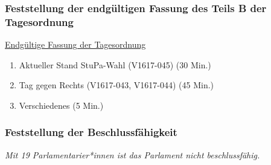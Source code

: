 \documentclass[ngerman,headheight=70pt]{scrartcl}
\begin{document}
    \subsubsection{Feststellung der endgültigen Fassung des Teils B der Tagesordnung}


    \newpage
    \underline{Endgültige Fassung der Tagesordnung}
    \begin{enumerate}[label={\textbf{Top \theenumi}},leftmargin=*]
        \item Aktueller Stand StuPa-Wahl (V1617-045) (30 Min.)
        \item Tag gegen Rechts (V1617-043, V1617-044) (45 Min.)
        \item Verschiedenes (5 Min.)
    \end{enumerate}

    \subsubsection{Feststellung der Beschlussfähigkeit}

    \textit{Mit 19 Parlamentarier*innen ist das Parlament nicht beschlussfähig.}

    
\end{document}
